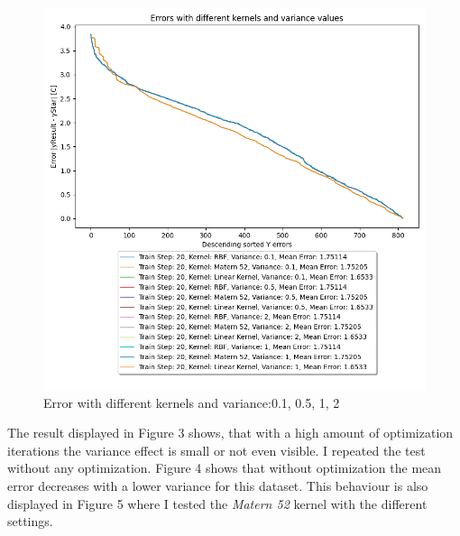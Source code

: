 \documentclass[10pt, a4paper, twocolumn]{article} %
\begin{document}
\begin{figure}[htbp] %
  \centering
  \includegraphics[width=\columnwidth]{pics/TrainStep20_Vtest.png}
  \caption{Error with different kernels and variance:0.1, 0.5, 1, 2}
  \label{fig:fibonacciPlot}
\end{figure}
The result displayed in Figure 3 shows, that with a high amount of optimization iterations the variance effect is small or not even visible. I repeated the test without any optimization. Figure 4 shows that without optimization the mean error decreases with a lower variance for this dataset. This behaviour is also displayed in Figure 5 where I tested the \textit{Matern 52} kernel with the different settings. 
\end{document}
